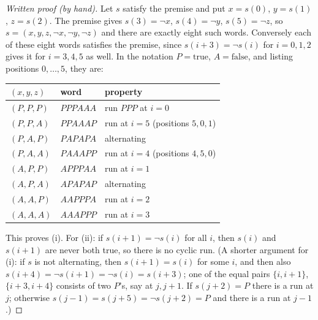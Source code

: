 \begin{proof}[Written proof (by hand)]
Let $s$ satisfy the premise and put $x=s(0)$, $y=s(1)$, $z=s(2)$. The premise gives $s(3)=\neg x$, $s(4)=\neg y$,
$s(5)=\neg z$, so $s=(x,y,z,\neg x,\neg y,\neg z)$ and there are exactly eight such words. Conversely each of
these eight words satisfies the premise, since $s(i+3)=\neg s(i)$ for $i=0,1,2$ gives it for $i=3,4,5$ as well. In
the notation $P=\mathrm{true}$, $A=\mathrm{false}$, and listing positions $0,\dots,5$, they are:
\begin{center}
\begin{tabular}{lll}
\toprule
$(x,y,z)$ & word & property \\
\midrule
$(P,P,P)$ & $PPPAAA$ & run $PPP$ at $i=0$ \\
$(P,P,A)$ & $PPAAAP$ & run at $i=5$ (positions $5,0,1$) \\
$(P,A,P)$ & $PAPAPA$ & alternating \\
$(P,A,A)$ & $PAAAPP$ & run at $i=4$ (positions $4,5,0$) \\
$(A,P,P)$ & $APPPAA$ & run at $i=1$ \\
$(A,P,A)$ & $APAPAP$ & alternating \\
$(A,A,P)$ & $AAPPPA$ & run at $i=2$ \\
$(A,A,A)$ & $AAAPPP$ & run at $i=3$ \\
\bottomrule
\end{tabular}
\end{center}
This proves (i). For (ii): if $s(i+1)=\neg s(i)$ for all $i$, then $s(i)$ and $s(i+1)$ are never both true, so
there is no cyclic run. (A shorter argument for (i): if $s$ is not alternating, then $s(i+1)=s(i)$ for some $i$, and
then also $s(i+4)=\neg s(i+1)=\neg s(i)=s(i+3)$; one of the equal pairs $\{i,i+1\}$, $\{i+3,i+4\}$ consists of two
$P$'s, say at $j,j+1$. If $s(j+2)=P$ there is a run at $j$; otherwise $s(j-1)=s(j+5)=\neg s(j+2)=P$ and there is a
run at $j-1$.)
\end{proof}

